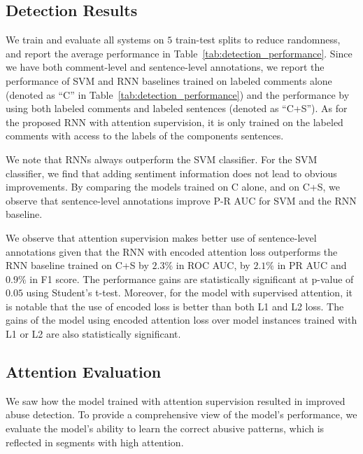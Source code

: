 \documentclass[letterpaper]{article}
\begin{document}
\subsection{Detection Results} We train and evaluate all systems on $5$ train-test splits to reduce randomness, and report
the average performance  in Table~\ref{tab:detection_performance}. Since we have both comment-level and sentence-level annotations, {we report the performance of SVM and RNN baselines trained on labeled comments alone (denoted as ``C'' in Table~\ref{tab:detection_performance}) and the performance by using both labeled comments and labeled sentences (denoted as ``C+S'').} As for the proposed RNN with attention supervision, it is only trained on the labeled comments with access to the labels of the components sentences.

We note that RNNs always outperform the SVM classifier.
For the SVM classifier, we find that adding sentiment information does not lead to obvious improvements. By comparing the models trained on C alone, and on C+S, we observe that sentence-level annotations improve P-R AUC for SVM and the RNN baseline.

We observe that  attention supervision  makes better use of sentence-level annotations given that the RNN with encoded attention loss outperforms the RNN baseline trained on C+S by $2.3\%$ in ROC AUC, by $2.1\%$ in PR AUC and $0.9\%$ in F1 score. The performance gains are statistically significant at p-value of $0.05$ using Student's t-test.  Moreover, for the model with supervised attention, it is notable that the use of encoded loss is better than both L1 and L2 loss. The gains of the model using encoded attention loss over model instances trained with L1 or L2 are also statistically significant.

\subsection{Attention Evaluation}
We saw how the model trained with attention supervision resulted in improved abuse detection.
To provide a comprehensive view of the model's performance,   we evaluate the model's  ability to learn the correct abusive patterns, which is reflected in segments with high attention.
\end{document}

